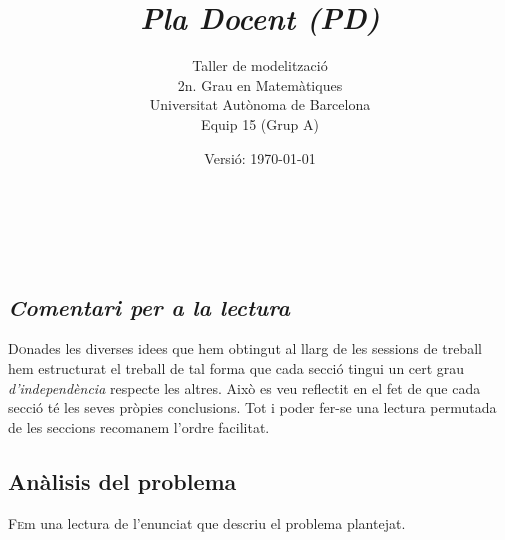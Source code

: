 \documentclass[10pt,twocolumn]{article}
\title{\emph{\color{redviolet!75!black}Pla Docent {(PD)}}}
\author{ Taller de modelització \\ 2n. Grau en  Matemàtiques \\ Universitat Autònoma de Barcelona \\ Equip 15 (Grup A)\\ }
\date{Versió: \today}
\newcommand{\esp}{\text{ }}
\begin{document}
	
\maketitle
\newpage
$$
\esp
$$
\\ 
\newpage
$$
\esp
$$
\\ 
\newpage
\tableofcontents
\vspace{5mm}
\newpage
\begin{tcolorbox}[colframe=white,colback=redviolet!20,sharp corners=all,size=minimal,halign=center,valign=center]
	\section{\textit{Comentari per a la lectura}}
\end{tcolorbox}
\lettrine{D}onades les  diverses idees  que hem obtingut al llarg de les sessions de treball hem estructurat el treball de tal forma que cada secció tingui un cert grau \textit{d'independència} respecte les altres. Això es veu reflectit en el fet de que cada secció té les seves pròpies conclusions. Tot i poder fer-se una lectura permutada de les seccions recomanem l'ordre facilitat. 
\\ 
\newpage
\begin{tcolorbox}[colframe=white,colback=redviolet!20,sharp corners=all,size=minimal,halign=center,valign=center]
\section{Anàlisis del problema}
\end{tcolorbox}
\lettrine{F}em una lectura de l'enunciat que descriu el problema plantejat. 

\vspace{5mm}
\end{document}
